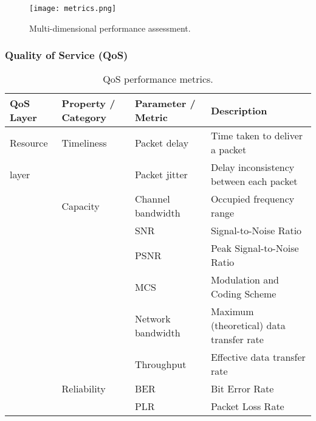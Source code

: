 \begin{figure}[htp]
	\centering
	\texttt{[image: metrics.png]}
	\vspace{-0.6cm}
	\caption{Multi-dimensional performance assessment.}
	\label{fig:IEEECOMSTperformance}
	\vspace{-0.6cm}
\end{figure}

\subsubsection{Quality of Service (QoS)}
\label{sec:IEEECOMSTqos}

\begin{table}[htp]
	\caption{QoS performance metrics.}
	\centering
	\label{tab:IEEECOMSTqosmetrics}
	\def\arraystretch{1.2}%
	\setlength\tabcolsep{2.0pt} %
	{\scriptsize
		\begin{tabular}{>{\centering\arraybackslash}m{}
				>{\centering\arraybackslash}m{}
				>{\centering\arraybackslash}m{}
				>{\centering\arraybackslash}m{}
		}
		\toprule
		\textbf{QoS Layer} & \textbf{Property / Category} & \textbf{Parameter / Metric} & \textbf{Description} \\
		\midrule
		\midrule
		Resource & Timeliness & Packet delay & Time taken to deliver a packet \\
		\cline{3-4}
		layer & & Packet jitter & Delay inconsistency between each packet \\
		\cline{2-4}
		& Capacity & Channel bandwidth & Occupied frequency range \\
		\cline{3-4}
		& & SNR & Signal-to-Noise Ratio\\
		\cline{3-4}
		& & PSNR & Peak Signal-to-Noise Ratio \\
		\cline{3-4}
		& & MCS & Modulation and Coding Scheme \\
		\cline{3-4} 
		& & Network bandwidth & Maximum (theoretical) data transfer rate \\
		\cline{3-4}
		& & Throughput & Effective data transfer rate \\
		\cline{2-4}
		& Reliability & BER & Bit Error Rate \\
		\cline{3-4}
		& & PLR & Packet Loss Rate \\

\end{tabular}}
\end{table}
